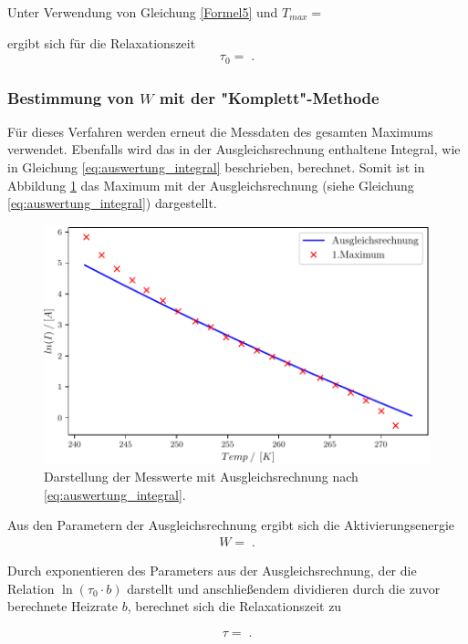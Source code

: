 Unter Verwendung von Gleichung \eqref{Formel5} und $T_{max} = $

ergibt sich für die Relaxationszeit
\begin{align}
	\tau_{0} = \;.
\end{align}

\subsubsection{Bestimmung von $W$ mit der "Komplett"-Methode}

Für dieses Verfahren werden erneut die Messdaten des gesamten Maximums verwendet. Ebenfalls wird das in der Ausgleichsrechnung enthaltene Integral, wie in Gleichung \ref{eq:auswertung_integral} beschrieben, berechnet. Somit ist in Abbildung \ref{fig:Auswertung_22_23} das Maximum mit der Ausgleichsrechnung (siehe Gleichung \ref{eq:auswertung_integral}) dargestellt.


\begin{figure}[H]
  \centering
  \includegraphics[width=.75\textwidth]{build/2_Temp_current_peak_log_3.pdf}
  \caption{Darstellung der Messwerte mit Ausgleichsrechnung nach \ref{eq:auswertung_integral}.}
  \label{fig:Auswertung_22_23}
\end{figure}


Aus den Parametern der Ausgleichsrechnung ergibt sich die Aktivierungsenergie 
\begin{align}
	W = \;.
\end{align}

Durch exponentieren des Parameters aus der Ausgleichsrechnung, der die Relation $\ln(\tau_0\cdot b)$ darstellt und anschließendem dividieren durch die zuvor berechnete Heizrate $b$, berechnet sich die Relaxationszeit zu

\begin{align}
	\tau = \;.
\end{align}


